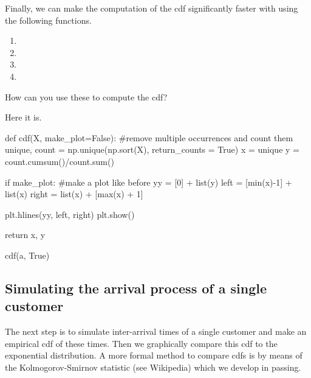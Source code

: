 \begin{exercise}
Finally, we can make the computation of the cdf significantly faster with using the following  functions. 
\begin{enumerate}
\item {}
\item {}
\item {}
\item {}
\end{enumerate}
How can you use these to compute the cdf?
\begin{solution}
Here it is.
\begin{pyverbatim}

def cdf(X, make_plot=False):
    #remove multiple occurrences and count them
    unique, count = np.unique(np.sort(X), return_counts = True)
    x = unique
    y = count.cumsum()/count.sum()
    
    if make_plot:
        #make a plot like before
        yy = [0] + list(y)
        left = [min(x)-1] + list(x)
        right = list(x) + [max(x) + 1]
        
        plt.hlines(yy, left, right)
        plt.show()
    
    return x, y
    

cdf(a, True)
\end{pyverbatim}

\end{solution}
\end{exercise}

\subsection{Simulating the arrival process of a single customer}
\label{sec:simulations}

The next step is to simulate inter-arrival times of a single customer and  make an empirical cdf of these times.  Then we graphically compare this cdf to the exponential distribution. A more formal method to compare cdfs is by means of the Kolmogorov-Smirnov statistic (see Wikipedia) which we develop in passing.

